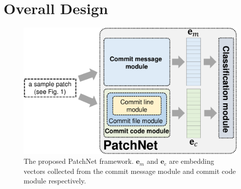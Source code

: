 \section{Overall Design}
\label{sec:design}

\begin{figure}[!t]
	\center
	\includegraphics[scale=0.38]{figures/framework_overall_ver1.pdf}
	\caption{The proposed PatchNet framework. $\textbf{e}_m$ and $\textbf{e}_c$ are embedding vectors collected from the commit message module and commit code module respectively.}
	\label{fig:patchnet}
    \vspace{-0.4cm}
\end{figure}